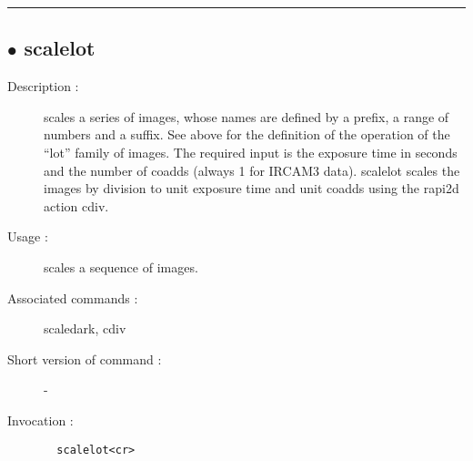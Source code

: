 \hrule \subsection*{$\bullet$ scalelot}
\begin{description}
\item[Description :] scales a series of images, whose names are defined by a
prefix, a range of numbers and a suffix. See above for the definition of
the operation of the ``lot'' family of images.  The required input is the
exposure time in seconds and the number of coadds (always 1 for {\sc IRCAM3}
data).  scalelot scales the images by division to unit exposure time and
unit coadds using the rapi2d action cdiv.
\item[Usage :] scales a sequence of images.
\item[Associated commands :] scaledark, cdiv
\item[Short version of command :] -
\item[Invocation :]

\verb+  scalelot<cr> +\end{description}

